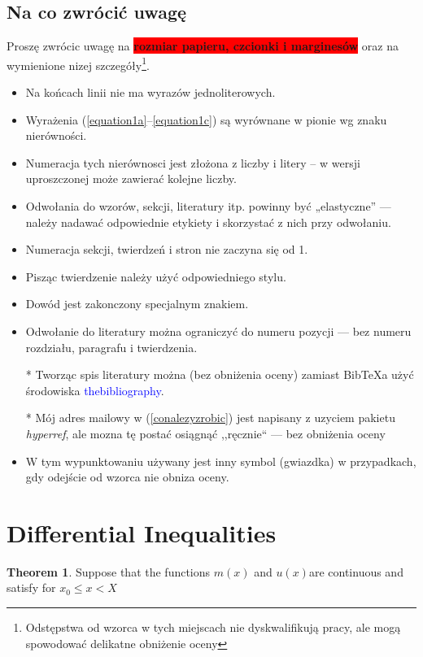 \documentclass[a4paper,11pt,fleqn]{article}
\begin{document}
\subsection{Na co zwrócić uwagę}
Proszę zwrócic uwagę na \colorbox{red}{\textbf{rozmiar papieru, czcionki i marginesów}} oraz na wymienione nizej szczegóły\footnote{Odstępstwa od wzorca w tych miejscach nie dyskwalifikują pracy, ale mogą spowodować delikatne obniżenie oceny}.
\begin{itemize}
\item Na końcach linii nie ma wyrazów jednoliterowych.
\item Wyrażenia (\ref{equation1a}–\ref{equation1c}) są wyrównane w pionie wg znaku nierówności.
\item Numeracja tych nierównosci jest złożona z liczby i litery – w wersji uproszczonej może
zawierać kolejne liczby.
\item Odwołania do wzorów, sekcji, literatury itp. powinny być „elastyczne” — należy nadawać
odpowiednie etykiety i skorzystać z nich przy odwołaniu.
\item Numeracja sekcji, twierdzeń i stron nie zaczyna się od 1.
\item Pisząc twierdzenie należy użyć odpowiedniego stylu.
\item Dowód jest zakonczony specjalnym znakiem.
\item Odwołanie do literatury można ograniczyć do numeru pozycji — bez numeru rozdziału, paragrafu i twierdzenia.
\item[*] Tworząc spis literatury można (bez obniżenia oceny) zamiast Bib{\TeX}a użyć środowiska
\textcolor{blue}{thebibliography}.
\item[*] Mój adres mailowy w (\ref{conalezyzrobic}) jest napisany z uzyciem pakietu \textit{hyperref}, ale mozna tę postać osiągnąć ,,ręcznie`` — bez obniżenia oceny
\item W tym wypunktowaniu używany jest inny symbol (gwiazdka) w przypadkach, gdy odejście od wzorca nie obniza oceny.
\end{itemize}
 
\newpage{}
\section{Differential Inequalities}
\theoremstyle{definition}
\newtheorem{theorem}{Theorem}
\setcounter{theorem}{7}
\begin {theorem}
\small {Suppose that the functions $m(x)$ and $u(x)$are continuous and satisfy for $x_0 \leq x < X$}
\end{theorem}
 
\end{document}
